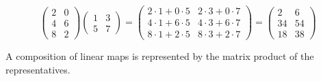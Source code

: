 \begin{example}
\begin{equation*}
  \begin{pmatrix}
     2  &0  \\
     4  &6  \\
     8  &2
  \end{pmatrix}
  \begin{pmatrix}
    1  &3  \\
    5  &7
  \end{pmatrix}
  =
  \begin{pmatrix}
   2\cdot 1+0\cdot 5  &2\cdot 3+0\cdot 7  \\
   4\cdot 1+6\cdot 5  &4\cdot 3+6\cdot 7  \\
   8\cdot 1+2\cdot 5  &8\cdot 3+2\cdot 7
  \end{pmatrix}
  =
  \begin{pmatrix}
    2  &6  \\
   34  &54 \\
   18  &38
  \end{pmatrix}
\end{equation*}
\end{example}


\begin{theorem}
\label{th:MatMultRepComp}
A composition of linear maps is represented by the matrix product
of the representatives.
\end{theorem}

